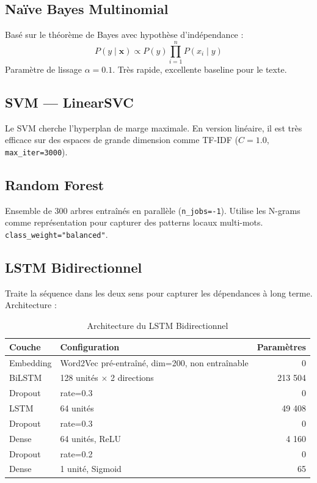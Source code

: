 \subsection{Naïve Bayes Multinomial}

Basé sur le théorème de Bayes avec hypothèse d'indépendance :
\begin{equation}
  P(y \mid \mathbf{x}) \propto P(y) \prod_{i=1}^{n} P(x_i \mid y)
\end{equation}
Paramètre de lissage $\alpha = 0.1$. Très rapide, excellente baseline pour le texte.

\subsection{SVM — LinearSVC}

Le SVM cherche l'hyperplan de marge maximale. En version linéaire, il est très efficace
sur des espaces de grande dimension comme TF-IDF ($C=1.0$, \texttt{max\_iter=3000}).

\subsection{Random Forest}

Ensemble de 300 arbres entraînés en parallèle (\texttt{n\_jobs=-1}). Utilise les N-grams
comme représentation pour capturer des patterns locaux multi-mots. \texttt{class\_weight="balanced"}.

\subsection{LSTM Bidirectionnel}

Traite la séquence dans les deux sens pour capturer les dépendances à long terme.
Architecture :

\begin{table}[H]
\centering
\caption{Architecture du LSTM Bidirectionnel}
\begin{tabular}{llr}
\toprule
\textbf{Couche} & \textbf{Configuration} & \textbf{Paramètres} \\
\midrule
Embedding   & Word2Vec pré-entraîné, dim=200, non entraînable & 0 \\
BiLSTM      & 128 unités $\times$ 2 directions & 213 504 \\
Dropout     & rate=0.3 & 0 \\
LSTM        & 64 unités & 49 408 \\
Dropout     & rate=0.3 & 0 \\
Dense       & 64 unités, ReLU & 4 160 \\
Dropout     & rate=0.2 & 0 \\
Dense       & 1 unité, Sigmoid & 65 \\
\bottomrule
\end{tabular}
\end{table}

